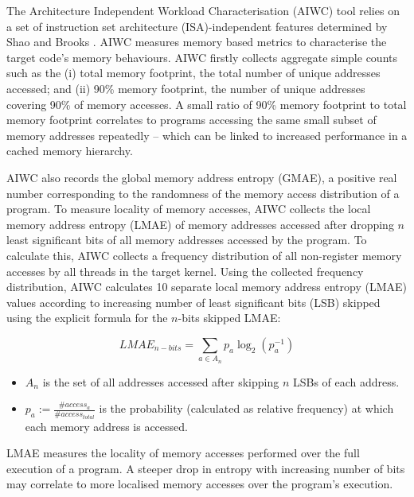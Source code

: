 \documentclass[review=false, sigchi]{acmart}
\begin{document}
	The Architecture Independent Workload Characterisation (AIWC) tool \cite{beauaiwc} relies on a set of instruction set architecture (ISA)-independent features determined by Shao and Brooks \cite{shao2013isa}. AIWC measures memory based metrics to characterise the target code's memory behaviours. AIWC firstly collects aggregate simple counts such as the (i) total memory footprint, the total number of unique addresses accessed; and (ii) 90\% memory footprint, the number of unique addresses covering 90\% of memory accesses. A small ratio of 90\% memory footprint to total memory footprint correlates to programs accessing the same small subset of memory addresses repeatedly -- which can be linked to increased performance in a cached memory hierarchy.
	
	AIWC also records the global memory address entropy (GMAE), a positive real number corresponding to the randomness of the memory access distribution of a program. To measure locality of memory accesses, AIWC collects the local memory address entropy (LMAE) of memory addresses accessed after dropping $n$ least significant bits of all memory addresses accessed by the program. To calculate this, AIWC collects a frequency distribution of all non-register memory accesses by all threads in the target kernel. Using the collected frequency distribution, AIWC calculates 10 separate local memory address entropy (LMAE) values according to increasing number of least significant bits (LSB) skipped using
	the explicit formula for the $n$-bits skipped LMAE:
	
	\begin{equation}
	LMAE_{n-bits} = \sum_{a \in A_n}p_a \log_2(p_a^{-1})
	\end{equation}
	
	\begin{itemize}
		\item $A_n$ is the set of all addresses accessed after skipping $n$ LSBs of each address.
		\item $p_a := \frac{\#access_a}{\#access_{total}}$ is the probability (calculated as relative frequency) at which each memory address is accessed.
	\end{itemize}
	
	LMAE measures the locality of memory accesses performed over the full execution of a program. A steeper drop in entropy with increasing number of bits may correlate to more localised memory accesses over the program's execution.
	
\end{document}

